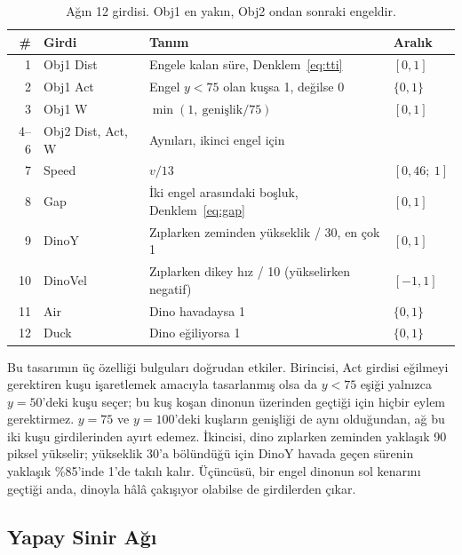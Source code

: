 \documentclass[11pt,a4paper]{article}
\begin{document}
\begin{table}[!htbp]
  \centering
  \small
  \caption{Ağın 12 girdisi. Obj1 en yakın, Obj2 ondan sonraki engeldir.}
  \label{tab:inputs}
  \begin{tabularx}{\linewidth}{@{}r l Y l@{}}
    \toprule
    \# & Girdi & Tanım & Aralık \\
     & Obj1 Dist & Engele kalan süre, Denklem~\eqref{eq:tti} & $[0, 1]$ \\
    2 & Obj1 Act & Engel $y < 75$ olan kuşsa 1, değilse 0 & $\{0, 1\}$ \\
    3 & Obj1 W & $\min(1,\ \text{genişlik}/75)$ & $[0, 1]$ \\
    4--6 & Obj2 Dist, Act, W & Aynıları, ikinci engel için & \\
    7 & Speed & $v/13$ & $[0{,}46;\ 1]$ \\
    8 & Gap & İki engel arasındaki boşluk, Denklem~\eqref{eq:gap} & $[0, 1]$ \\
    9 & DinoY & Zıplarken zeminden yükseklik / 30, en çok 1 & $[0, 1]$ \\
    10 & DinoVel & Zıplarken dikey hız / 10 (yükselirken negatif) & $[-1, 1]$ \\
    11 & Air & Dino havadaysa 1 & $\{0, 1\}$ \\
    12 & Duck & Dino eğiliyorsa 1 & $\{0, 1\}$ \\
    \bottomrule
  \end{tabularx}
\end{table}
\FloatBarrier

Bu tasarımın üç özelliği bulguları doğrudan etkiler. Birincisi, Act girdisi eğilmeyi gerektiren kuşu işaretlemek amacıyla tasarlanmış olsa da $y < 75$ eşiği yalnızca ${y = 50}$'deki kuşu seçer; bu kuş koşan dinonun üzerinden geçtiği için hiçbir eylem gerektirmez. ${y = 75}$ ve ${y = 100}$'deki kuşların genişliği de aynı olduğundan, ağ bu iki kuşu girdilerinden ayırt edemez. İkincisi, dino zıplarken zeminden yaklaşık 90 piksel yükselir; yükseklik 30'a bölündüğü için DinoY havada geçen sürenin yaklaşık \%85'inde 1'de takılı kalır. Üçüncüsü, bir engel dinonun sol kenarını geçtiği anda, dinoyla hâlâ çakışıyor olabilse de girdilerden çıkar.

\subsection{Yapay Sinir Ağı}
\end{document}
